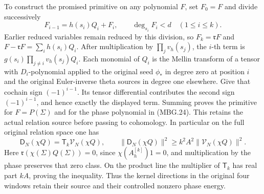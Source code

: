 To construct the promised primitive on any polynomial \(F\),
set \(F_0=F\) and divide successively
\[
 F_{i-1}=h(s_i)Q_i+F_i,\qquad \deg_{s_i}F_i<d
       \quad(1\le i\le k).
 \tag{MBG.26}\label{GraphV2:eq:mbg-divisions}
\]
Earlier reduced variables remain reduced by this division, so
\(F_k=\mathfrak rF\) and \(F-\mathfrak rF=\sum_i h(s_i)Q_i\).
After multiplication by \(\prod_jv_h(s_j)\), the \(i\)-th term is
\(g(s_i)\prod_{j\ne i}v_h(s_j)Q_i\). Each monomial of \(Q_i\)
is the Mellin transform of a tensor with \(D_i\)-polynomial applied
to the original seed \(\phi_*\) in degree zero at position \(i\)
and the original Euler-inverse theta sources in degree one elsewhere.
Give that cochain sign \((-1)^{i-1}\). Its tensor differential
contributes the second sign \((-1)^{i-1}\), and hence exactly the
displayed term. Summing proves the primitive for \(F=P(\Sigma)\)
and for the phase polynomial in (MBG.24). This retains the actual
relation source before passing to cohomology.
In particular on the full original relation space one has
\[
 \mathsf D_N(\chi Q)=\mathsf T_k\mathcal V_N(\chi Q),\qquad
 \|\mathsf D_N(\chi Q)\|^2\ge k^2A^2
                                  \|\mathcal V_N(\chi Q)\|^2.
 \tag{MBG.27}\label{GraphV2:eq:mbg-relation-control}
\]
Here \(\mathfrak r(\chi(\Sigma)Q(\Sigma))=0\), since
\(\chi(A_h^{[k]})1=0\), and multiplication by the phase preserves
that zero class. On the product line the multiplier of
\(\mathsf T_k\) has real part \(kA\), proving the inequality.
Thus the kernel directions in the original four windows retain
their source and their controlled nonzero phase energy.

